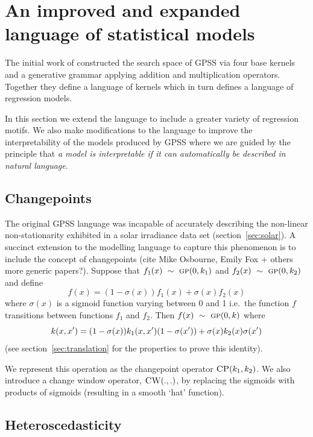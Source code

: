 \documentclass{article}
\def\ie{i.e.\ }
\begin{document}
\section{An improved and expanded language of statistical models}
\label{sec:improvements}

The initial work of \cite{DuvLloGroetal13} constructed the search space of GPSS via four base kernels and a generative grammar applying addition and multiplication operators.
Together they define a language of kernels which in turn defines a language of regression models.

In this section we extend the language to include a greater variety of regression motifs.
We also make modifications to the language to improve the interpretability of the models produced by GPSS where we are guided by the principle that \emph{a model is interpretable if it can automatically be described in natural language}.

\subsection{Changepoints}

The original GPSS language was incapable of accurately describing the non-linear non-stationarity exhibited in a solar irradiance data set (section~\ref{sec:solar}).
A succinct extension to the modelling language to capture this phenomenon is to include the concept of changepoints (cite Mike Osbourne, Emily Fox + others more generic papers?).
Suppose that $f_1(x) \ \sim\  {\textsc{gp}}{}(0, k_1)$ and $f_2(x) \ \sim\  {\textsc{gp}}{}(0, k_2)$ and define
\begin{equation}
f(x) = (1-\sigma(x))f_1(x) + \sigma(x)f_2(x)
\end{equation}
where $\sigma(x)$ is a sigmoid function varying between 0 and 1 \ie the function $f$ transitions between functions $f_1$ and $f_2$.
Then $f(x) \ \sim\  {\textsc{gp}}{}(0,k)$ where
\begin{equation}
\kernel(x,x') = (1-\sigma(x))k_1(x,x')(1-\sigma(x')) + \sigma(x)k_2(x)\sigma(x')
\label{eq:cp}
\end{equation}
(see section~\ref{sec:translation} for the properties to prove this identity).

We represent this operation as the changepoint operator ${\textsc{CP}}(k_1, k_2)$.
We also introduce a change window operator, ${\textsc{CW}}(.,.)$, by replacing the sigmoids with products of sigmoids (resulting in a smooth `hat' function).

\subsection{Heteroscedasticity}
\end{document}
